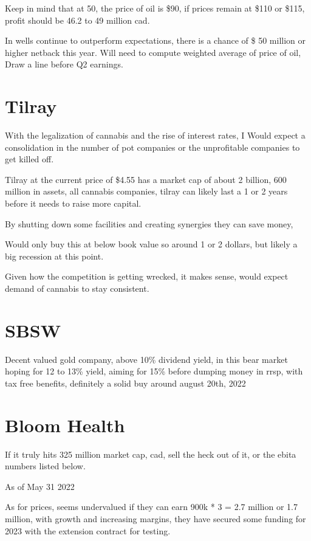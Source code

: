 Keep in mind that at 50, the price of oil is \$90, if prices remain at \$110 or \$115, profit should be 46.2 to 49 million cad.

In wells continue to outperform expectations, there is a chance of \$ 50 million or higher netback this year. Will need to compute weighted average of price of oil, Draw a line before Q2 earnings.


\section{Tilray}

With the legalization of cannabis and the rise of interest rates, I Would expect a consolidation in the number of pot companies or the unprofitable companies to get killed off.

Tilray at the current price of \$4.55 has a market cap of about 2 billion, 600 million in assets, all cannabis companies, tilray can likely last a 1 or 2 years before it needs to raise more capital.

By shutting down some facilities and creating synergies they can save money,

Would only buy this at below book value so around 1 or 2 dollars, but likely a big recession at this point.

Given how the competition is getting wrecked, it makes sense, would expect demand of cannabis to stay consistent.


\section{SBSW}

Decent valued gold company, above 10\% dividend yield, in this bear market hoping for 12 to 13\% yield, aiming for 15\% before dumping money in rrsp, with tax free benefits, definitely a solid buy around august 20th, 2022

\section{Bloom Health}


If it truly hits 325 million market cap, cad, sell the heck out of it, or the ebita numbers listed below.

As of May 31 2022

As for prices, seems undervalued if they can earn 900k * 3 = 2.7 million or 1.7 million,  with growth and increasing margins, they have secured some funding for 2023 with the extension contract for testing.

